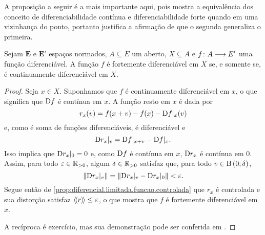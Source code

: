 A proposição a seguir é a mais importante aqui, pois mostra a equivalência dos conceito de diferenciabilidade contínua e diferenciabilidade forte quando em uma vizinhança do ponto, portanto justifica a afirmação de que o segunda generaliza o primeira.

\begin{proposition}
\label{prop:equiv.continuamente.fortemente.diferenciavel}
Sejam $\bm E$ e $\bm E'$ espaços normados, $A \subseteq E$ um aberto, $X \subseteq A$ e $f\colon \allowbreak A \longrightarrow E'$ uma função diferenciável. A função $f$ é fortemente diferenciável em $X$ se, e somente se, é continuamente diferenciável em $X$.
\end{proposition}
\begin{proof}
Seja $x \in X$. Suponhamos que $f$ é continuamente diferenciável em $x$, o que significa que $\mathrm{D} f$ é contínua em $x$. A função resto em $x$ é dada por
	\begin{equation*}
	r_x(v) = f(x+v) - f(x) - \mathrm{D} f|_x(v)
	\end{equation*}
e, como é soma de funções diferenciáveis, é diferenciável e
	\begin{equation*}
	\mathrm{D} r_x|_v = \mathrm{D} f|_{x+v} - \mathrm{D} f|_x.
	\end{equation*}
Isso implica que $\mathrm{D} r_x|_0 = 0$ e, como $\mathrm{D} f$ é contínua em $x$, $\mathrm{D} r_x$ é contínua em $0$. Assim, para todo $\varepsilon \in \mathbb{R}_{>0}$, algum $\delta \in \mathbb{R}_{>0}$ satisfaz que, para todo $v \in \mathrm{B}\left(0; \delta\right)$,
	\begin{equation*}
	\left\Vert{\mathrm{D}r_x|_v}\right\Vert = \left\Vert{\mathrm{D}r_x|_v - \mathrm{D}r_x|_0}\right\Vert < \varepsilon.
	\end{equation*}
Segue então de \ref{prop:diferencial.limitada.funcao.controlada} que $r_x$ é controlada e sua distorção satisfaz $\langle\!\langle{r}\rangle\!\rangle \leq \varepsilon$, o que mostra que $f$ é fortemente diferenciável em $x$.

A recíproca é exercício, mas sua demonstração pode ser conferida em \cite[p. 279]{liv:Lima-CursoAnalise2}.
\end{proof}


